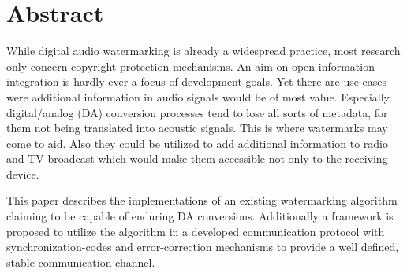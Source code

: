 \chapter*{Abstract}

While digital audio watermarking is already a widespread practice, most research only concern copyright protection mechanisms. An aim on open information integration is hardly ever a focus of development goals. Yet there are use cases were additional information in audio signals would be of most value. Especially digital/analog (DA) conversion processes tend to lose all sorts of metadata, for them not being translated into acoustic signals.
This is where watermarks may come to aid. Also they could be utilized to add additional information to radio and TV broadcast which would make them accessible not only to the receiving device.

This paper describes the implementations of an existing watermarking algorithm claiming to be capable of enduring DA conversions. Additionally a framework is proposed to utilize the algorithm in a developed communication protocol with synchronization-codes and error-correction mechanisms to provide a well defined, stable communication channel.


